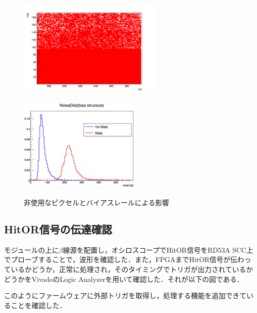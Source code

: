 \begin{figure}[h]
  \centering
  \begin{minipage}[b]{0.45\linewidth}
    \centering
    \includegraphics[width=7cm]{./figure/EnablePix.png}
    \label{fig:enablemap}
  \end{minipage}
  \begin{minipage}[b]{0.45\linewidth}
    \centering
    \includegraphics[width=6cm]{./figure/noisedist.png}
    \label{fig:noisedist}
  \end{minipage}
  \caption{非使用なピクセルとバイアスレールによる影響}
\end{figure}


\subsection{HitOR信号の伝達確認}
モジュールの上に$\beta$線源を配置し，オシロスコープでHitOR信号をRD53A SCC上でプローブすることで，波形を確認した．また，FPGAまでHitOR信号が伝わっているかどうか，正常に処理され，そのタイミングでトリガが出力されているかどうかをVivadoのLogic Analyzerを用いて確認した．それが以下の図である．



このようにファームウェアに外部トリガを取得し，処理する機能を追加できていることを確認した．






